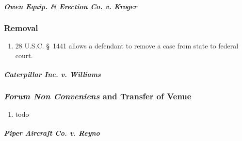 \paragraph{\emph{Owen Equip. \& Erection Co. v. Kroger}} %

\subsubsection{Removal}

\begin{enumerate}
    \item 28 U.S.C. \S\ 1441 allows a defendant to remove a case from state to federal court. %
\end{enumerate}

\paragraph{\emph{Caterpillar Inc. v. Williams}} %

\subsubsection{\emph{Forum Non Conveniens} and Transfer of Venue}

\begin{enumerate}
    \item todo
\end{enumerate}

\paragraph{\emph{Piper Aircraft Co. v. Reyno}} %

